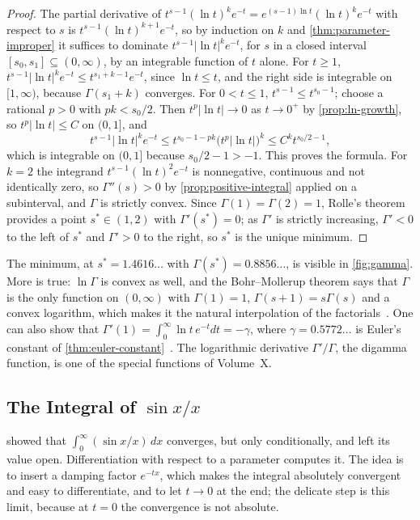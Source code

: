 \begin{proof}
The partial derivative of $t^{s-1}(\ln t)^ke^{-t}=e^{(s-1)\ln t}(\ln t)^ke^{-t}$ with respect to $s$ is $t^{s-1}(\ln t)^{k+1}e^{-t}$, so by induction on $k$ and \cref{thm:parameter-improper} it suffices to dominate $t^{s-1}|\ln t|^ke^{-t}$, for $s$ in a closed interval $[s_0,s_1]\subseteq(0,\infty)$, by an integrable function of $t$ alone. For $t\ge1$, $t^{s-1}|\ln t|^ke^{-t}\le t^{s_1+k-1}e^{-t}$, since $\ln t\le t$, and the right side is integrable on $[1,\infty)$, because $\Gamma(s_1+k)$ converges. For $0<t\le1$, $t^{s-1}\le t^{s_0-1}$; choose a rational $p>0$ with $pk<s_0/2$. Then $t^{p}|\ln t|\to0$ as $t\to0^+$ by \cref{prop:ln-growth}, so $t^p|\ln t|\le C$ on $(0,1]$, and
\[
t^{s-1}|\ln t|^ke^{-t}\le t^{s_0-1-pk}\bigl(t^p|\ln t|\bigr)^k\le C^kt^{s_0/2-1},
\]
which is integrable on $(0,1]$ because $s_0/2-1>-1$. This proves the formula. For $k=2$ the integrand $t^{s-1}(\ln t)^2e^{-t}$ is nonnegative, continuous and not identically zero, so $\Gamma''(s)>0$ by \cref{prop:positive-integral} applied on a subinterval, and $\Gamma$ is strictly convex. Since $\Gamma(1)=\Gamma(2)=1$, Rolle's theorem provides a point $s^*\in(1,2)$ with $\Gamma'(s^*)=0$; as $\Gamma'$ is strictly increasing, $\Gamma'<0$ to the left of $s^*$ and $\Gamma'>0$ to the right, so $s^*$ is the unique minimum.
\end{proof}

The minimum, at $s^*=1.4616\ldots$ with $\Gamma(s^*)=0.8856\ldots$, is visible in \cref{fig:gamma}. More is true: $\ln\Gamma$ is convex as well, and the Bohr--Mollerup theorem says that $\Gamma$ is the only function on $(0,\infty)$ with $\Gamma(1)=1$, $\Gamma(s+1)=s\Gamma(s)$ and a convex logarithm, which makes it the natural interpolation of the factorials~\cite{artin1964gamma}. One can also show that $\Gamma'(1)=\int_0^\infty\ln t\,e^{-t}dt=-\gamma$, where $\gamma=0.5772\ldots$ is Euler's constant of \cref{thm:euler-constant}~\cite{havil2003gamma}. The logarithmic derivative $\Gamma'/\Gamma$, the digamma function, is one of the special functions of Volume~X.

\subsection{The Integral of \texorpdfstring{$\sin x/x$}{sin x / x}}

 showed that $\int_0^\infty(\sin x/x)\,dx$ converges, but only conditionally, and left its value open. Differentiation with respect to a parameter computes it. The idea is to insert a damping factor $e^{-tx}$, which makes the integral absolutely convergent and easy to differentiate, and to let $t\to0$ at the end; the delicate step is this limit, because at $t=0$ the convergence is not absolute.

